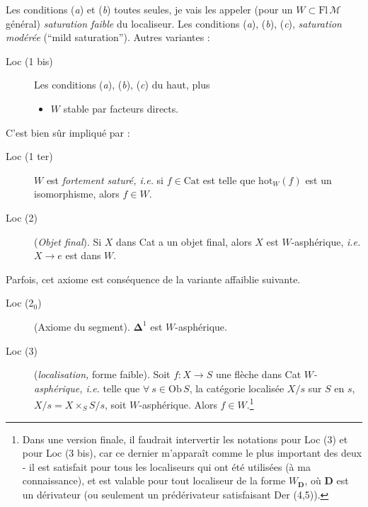 \documentclass[11pt]{article}
\newcommand{\msp}[1]{\marginpar{\footnotesize [#1]}}
\newcommand{\Cat}{\mathrm{Cat}}
\newcommand{\Ob}{\mathrm{Ob}\,}
\newcommand{\hot}{\mathrm{hot}}
\begin{document}
Les conditions (\textit{a}) et (\textit{b}) toutes seules, je vais les appeler (pour un $W \subset \mathrm{Fl}\,\mathcal{M}$ général) \textit{saturation faible} du localiseur. Les conditions (\textit{a}), (\textit{b}), (\textit{c}), \textit{saturation modérée} (“mild saturation”). Autres variantes :

\begin{description}
\item[Loc (1 bis)] Les conditions (\textit{a}), (\textit{b}), (\textit{c}) du haut, plus
\begin{itemize}
\item[\textit{d})] $W$ stable par facteurs directs.
\end{itemize}
\end{description}

C’est bien sûr impliqué par :

\begin{description}
\item[Loc (1 ter)] $W$ est \textit{fortement saturé, i.e.} si $f \in \Cat$ est telle que $\hot_W(f)$ est un isomorphisme, alors $f \in W$.
\item[Loc (2)] (\textit{Objet final}). Si $X$ dans Cat a un objet final, alors $X$ est $W$-asphérique, \textit{i.e.} $X \longrightarrow e$ est dans $W$.
\end{description}

Parfois, cet axiome est conséquence de la variante affaiblie suivante.

\begin{description}
\item[Loc (2$_0$)] (Axiome du segment). $\boldsymbol{\Delta}^1$ est $W$-asphérique.
\end{description}

\msp{page 2}

\begin{description}
\item[Loc (3)] (\textit{localisation,} forme faible). Soit $f : X \longrightarrow S$ une flèche dans Cat $W$\textit{-asphérique, i.e.} telle que $\forall\ s \in \Ob S$, la catégorie localisée $X/s$ sur $S$ en $s$, $X/s = X \times_S S/s$, soit $W$-asphérique. Alors $f \in W$.\footnote[1]{Dans une version finale, il faudrait intervertir les notations pour Loc (3) et pour Loc (3 bis), car ce dernier m’apparaît comme le plus important des deux - il est satisfait pour tous les localiseurs qui ont été utilisées (à ma connaissance), et est valable pour tout localiseur de la forme $W_{\mathbf{D}}$, où $\mathbf{D}$ est un dérivateur (ou seulement un prédérivateur satisfaisant Der (4,5)).} %
\end{description}
\end{document}
